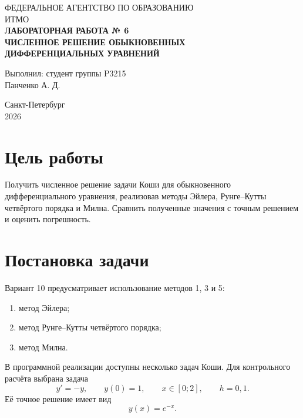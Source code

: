 \documentclass[12pt,a4paper]{article}
\begin{document}
\begin{titlepage}
\begin{center}
ФЕДЕРАЛЬНОЕ АГЕНТСТВО ПО ОБРАЗОВАНИЮ\\[3mm]
ИТМО\\[35mm]
\textbf{ЛАБОРАТОРНАЯ РАБОТА № 6}\\[5mm]
\textbf{ЧИСЛЕННОЕ РЕШЕНИЕ ОБЫКНОВЕННЫХ\\
ДИФФЕРЕНЦИАЛЬНЫХ УРАВНЕНИЙ}\\[35mm]
\end{center}

\begin{flushright}
Выполнил: студент группы P3215\\
Панченко А. Д.
\end{flushright}

\vfill
\begin{center}
Санкт-Петербург\\2026
\end{center}
\end{titlepage}

\section*{Цель работы}
Получить численное решение задачи Коши для обыкновенного дифференциального уравнения, реализовав методы Эйлера, Рунге--Кутты четвёртого порядка и Милна. Сравнить полученные значения с точным решением и оценить погрешность.

\section{Постановка задачи}
Вариант 10 предусматривает использование методов 1, 3 и 5:
\begin{enumerate}
    \item метод Эйлера;
    \item метод Рунге--Кутты четвёртого порядка;
    \item метод Милна.
\end{enumerate}

В программной реализации доступны несколько задач Коши. Для контрольного расчёта выбрана задача
\begin{equation}
    y'=-y, \qquad y(0)=1, \qquad x\in[0;2], \qquad h=0{,}1.
\end{equation}
Её точное решение имеет вид
\begin{equation}
    y(x)=e^{-x}.
\end{equation}
\end{document}
